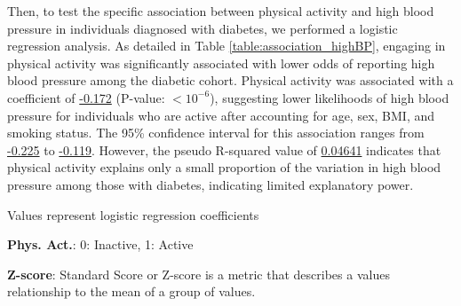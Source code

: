 \documentclass[11pt]{article}
\begin{document}
Then, to test the specific association between physical activity and high blood pressure in individuals diagnosed with diabetes, we performed a logistic regression analysis. As detailed in Table \ref{table:association_highBP}, engaging in physical activity was significantly associated with lower odds of reporting high blood pressure among the diabetic cohort. Physical activity was associated with a coefficient of \hyperlink{B1a}{-0.172} (P-value: $<$\hyperlink{B1d}{$10^{-6}$}), suggesting lower likelihoods of high blood pressure for individuals who are active after accounting for age, sex, BMI, and smoking status. The 95\% confidence interval for this association ranges from \hyperlink{B1e}{-0.225} to \hyperlink{B1f}{-0.119}. However, the pseudo R-squared value of \hyperlink{R1a}{0.04641} indicates that physical activity explains only a small proportion of the variation in high blood pressure among those with diabetes, indicating limited explanatory power.

\begin{table}[h]
\caption{\protect\hyperlink{file-table-1-pkl}{Association between physical activity and high blood pressure among diabetics}}
\label{table:association_highBP}
\begin{threeparttable}
\renewcommand{\TPTminimum}{\linewidth}
\begin{tablenotes}
\footnotesize
\item Values represent logistic regression coefficients
\item \textbf{Phys. Act.}: 0: Inactive, 1: Active
\item \textbf{Z-score}: Standard Score or Z-score is a metric that describes a values relationship to the mean of a group of values.
\end{tablenotes}
\end{threeparttable}
\end{table}
\end{document}
